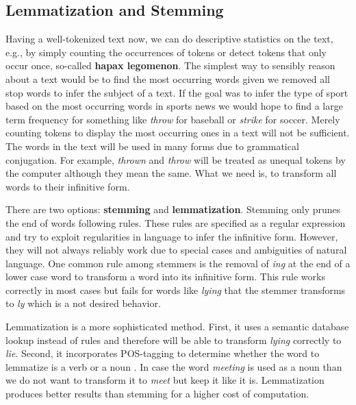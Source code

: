 \subsection{Lemmatization and Stemming}\label{stemming}
Having a well-tokenized text now, we can do descriptive statistics on the text, e.g., by simply counting the occurrences of tokens or detect tokens that only occur once, so-called \textbf{hapax legomenon}.
The simplest way to sensibly reason about a text would be to find the most occurring words given we removed all stop words to infer the subject of a text.
If the goal was to infer the type of sport based on the most occurring words in sports news we would hope to find a large term frequency for something like \textit{throw} for baseball or \textit{strike} for soccer.
Merely counting tokens to display the most occurring ones in a text will not be sufficient.
The words in the text will be used in many forms due to grammatical conjugation.
For example, \textit{thrown} and \textit{throw} will be treated as unequal tokens by the computer although they mean the same.
What we need is, to transform all words to their infinitive form.

There are two options: \textbf{stemming} and \textbf{lemmatization}.
Stemming only prunes the end of words following rules.
These rules are specified as a regular expression and try to exploit regularities in language to infer the infinitive form.
However, they will not always reliably work due to special cases and ambiguities of natural language.
One common rule among stemmers is the removal of \textit{ing} at the end of a lower case word to transform a word into its infinitive form. This rule works correctly in most cases but fails for words like \textit{lying} that the stemmer transforms to \textit{ly} which is a not desired behavior.

Lemmatization is a more sophisticated method.
First, it uses a semantic database lookup instead of rules and therefore will be able to transform \textit{lying} correctly to \textit{lie}.
Second, it incorporates POS-tagging to determine whether the word to lemmatize is a verb or a noun \citep{Muller2015}.
In case the word \textit{meeting} is used as a noun than we do not want to transform it to \textit{meet} but keep it like it is. Lemmatization produces better results than stemming \citep{Balakrishnan2014}  for a higher cost of computation.



